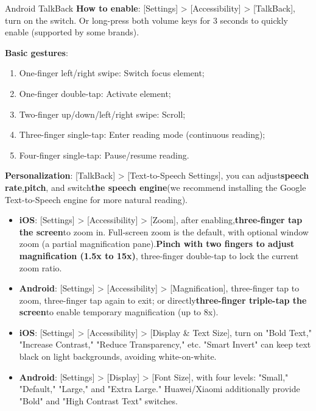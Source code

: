 \begin{tcbinfo}{Android TalkBack}
\textbf{How to enable}: [Settings] > [Accessibility] > [TalkBack], turn on the switch. Or long-press both volume keys for 3 seconds to quickly enable (supported by some brands).

\textbf{Basic gestures}:

\begin{enumerate}
  \item One-finger left/right swipe: Switch focus element;
  \item One-finger double-tap: Activate element;
  \item Two-finger up/down/left/right swipe: Scroll;
  \item Three-finger single-tap: Enter reading mode (continuous reading);
  \item Four-finger single-tap: Pause/resume reading.
\end{enumerate}

\textbf{Personalization}: [TalkBack] > [Text-to-Speech Settings], you can adjust\textbf{speech rate},\textbf{pitch}, and switch\textbf{the speech engine}(we recommend installing the Google Text-to-Speech engine for more natural reading).

\end{tcbinfo}



\begin{itemize}
  \item \textbf{iOS}: [Settings] > [Accessibility] > [Zoom], after enabling,\textbf{three-finger tap the screen}to zoom in. Full-screen zoom is the default, with optional window zoom (a partial magnification pane).\textbf{Pinch with two fingers to adjust magnification (1.5x to 15x)}, three-finger double-tap to lock the current zoom ratio.
  \item \textbf{Android}: [Settings] > [Accessibility] > [Magnification], three-finger tap to zoom, three-finger tap again to exit; or directly\textbf{three-finger triple-tap the screen}to enable temporary magnification (up to 8x).
\end{itemize}


\begin{itemize}
  \item \textbf{iOS}: [Settings] > [Accessibility] > [Display \& Text Size], turn on "Bold Text," "Increase Contrast," "Reduce Transparency," etc. "Smart Invert" can keep text black on light backgrounds, avoiding white-on-white.
  \item \textbf{Android}: [Settings] > [Display] > [Font Size], with four levels: "Small," "Default," "Large," and "Extra Large." Huawei/Xiaomi additionally provide "Bold" and "High Contrast Text" switches.
\end{itemize}


